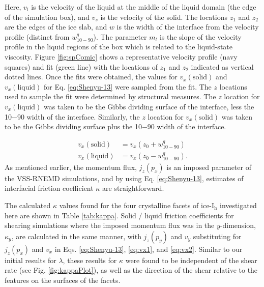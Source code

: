 Here, $v_{l}$ is the velocity of the liquid at the middle of the
liquid domain (the edge of the simulation box), and $v_{s}$ is the
velocity of the solid. The locations $z_{1}$ and $z_{2}$ are the edges
of the ice slab, and $w$ is the width of the interface from the
velocity profile (distinct from $w_{10-90}^{q}$). The parameter
$m_{l}$ is the slope of the velocity profile in the liquid regions of
the box which is related to the liquid-state viscosity. Figure
\ref{fig:spComic} shows a representative velocity profile (navy
squares) and fit (green line) with the locations of $z_{1}$ and
$z_{2}$ indicated as vertical dotted lines. Once the fits were
obtained, the values for $v_{x}(\mathrm{solid})$ and $v_{x}(\mathrm{liquid})$ for
Eq. \eqref{eq:Shenyu-13} were sampled from the fit. The $z$ locations
used to sample the fit were determined by structural measures. The $z$
location for $v_{x}(\mathrm{liquid})$ was taken to be the Gibbs dividing
surface of the interface, less the 10$-$90 width of the
interface. Similarly, the $z$ location for $v_{x}(\mathrm{solid})$ was taken to
be the Gibbs dividing surface plus the 10$-$90 width of the interface.

\begin{align}
v_{x}(\mathrm{solid}) & = v_{x}( z_0 + w_\mathrm{10-90}^{q})  \label{eq:vx1}\\
v_{x}(\mathrm{liquid}) & = v_{x}( z_0 - w_\mathrm{10-90}^{q}). \label{eq:vx2}
\end{align}
As mentioned earlier, the momentum flux, $j_{z}(p_{x})$ is an imposed
parameter of the VSS-RNEMD simulations, and by using
Eq. \eqref{eq:Shenyu-13}, estimates of interfacial friction
coefficient $\kappa$ are straightforward.

The calculated $\kappa$ values found for the four crystalline facets
of ice-I$_\mathrm{h}$ investigated here are shown in Table
\ref{tab:kappa}. Solid / liquid friction coefficients for shearing
simulations where the imposed momentum flux was in the $y$-dimension,
$\kappa_{y}$, are calculated in the same manner, with $j_{z}(p_{y})$
and $v_{y}$ substituting for $j_{z}(p_{x})$ and $v_{x}$ in
Eqs. \eqref{eq:Shenyu-13}, \eqref{eq:vx1}, and \eqref{eq:vx2}.
Similar to our initial results for $\lambda$, these results
for $\kappa$ were found to be independent of the shear rate (see
Fig. \ref{fig:kappaPlot}), as well as the direction of the shear
relative to the features on the surfaces of the facets.



